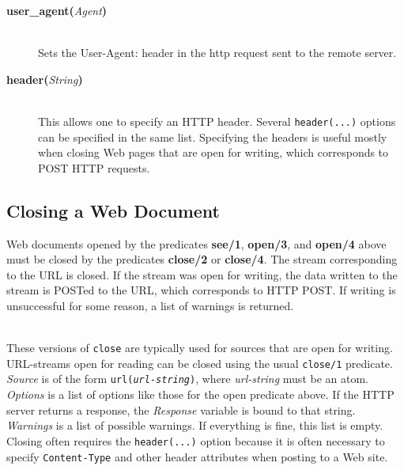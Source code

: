 \begin{description}
\begin{description}
  \item[{\bf user\_agent}{\bf (}{\it Agent}{\bf )}]\mbox{}\\Sets the User-Agent: header in the http request sent to the remote server.

  \item[{\bf header}{\bf (}{\it String}{\bf )}]\mbox{}\\This allows one
    to specify an HTTP header. Several \texttt{header(...)} options can be
    specified in the same list. Specifying the headers is useful mostly
    when closing
    Web pages that are open for writing, which corresponds to POST HTTP
    requests.

  \end{description}


\end{description}

\subsection{Closing a Web Document}

Web documents opened by the predicates {\bf see/1}, {\bf open/3}, and {\bf
  open/4} above must be closed by the predicates {\bf close/2} or {\bf
  close/4}. The stream corresponding to the URL is closed. If the stream
was open for writing, the data written to the stream is POSTed
to the URL, which corresponds to HTTP POST.
If writing is unsuccessful for some reason,
a list of warnings is returned.

\begin{description}

\item[close({\it +Source, +Options})]\mbox{}
\item[close({\it +Source, +Options, -Response, -Warnings})]\mbox{}
  \\
These versions of \texttt{close} are typically used for sources that
are open for writing. URL-streams open for reading can be closed using the
usual \texttt{close/1} predicate. 
{\it Source} is of the form {\tt url({\it {url-string}})},
where \emph{url-string} must be an atom. {\it Options} is a list
of options like those for the open predicate above.
If the HTTP server returns a response, the \emph{Response} variable is
bound to that string. \emph{Warnings} is a list of possible warnings. If
everything is fine, this list is empty.  
Closing often requires the \texttt{header(...)} option because it
is often necessary to specify \texttt{Content-Type} and other header
attributes when posting to a Web site. 

\end{description}


